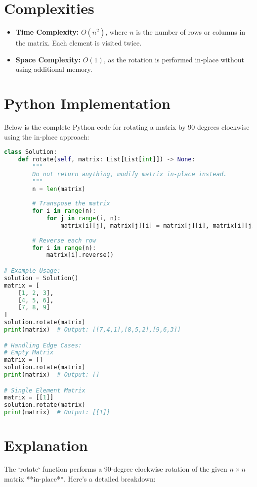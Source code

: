 \section*{Complexities}
\begin{itemize}
    \item \textbf{Time Complexity:} \(O(n^2)\), where \(n\) is the number of rows or columns in the matrix. Each element is visited twice.
    \item \textbf{Space Complexity:} \(O(1)\), as the rotation is performed in-place without using additional memory.
\end{itemize}

\section*{Python Implementation}

Below is the complete Python code for rotating a matrix by 90 degrees clockwise using the in-place approach:

\begin{fullwidth}
\begin{lstlisting}[language=Python]
class Solution:
    def rotate(self, matrix: List[List[int]]) -> None:
        """
        Do not return anything, modify matrix in-place instead.
        """
        n = len(matrix)
        
        # Transpose the matrix
        for i in range(n):
            for j in range(i, n):
                matrix[i][j], matrix[j][i] = matrix[j][i], matrix[i][j]
        
        # Reverse each row
        for i in range(n):
            matrix[i].reverse()

# Example Usage:
solution = Solution()
matrix = [
    [1, 2, 3],
    [4, 5, 6],
    [7, 8, 9]
]
solution.rotate(matrix)
print(matrix)  # Output: [[7,4,1],[8,5,2],[9,6,3]]

# Handling Edge Cases:
# Empty Matrix
matrix = []
solution.rotate(matrix)
print(matrix)  # Output: []

# Single Element Matrix
matrix = [[1]]
solution.rotate(matrix)
print(matrix)  # Output: [[1]]
\end{lstlisting}
\end{fullwidth}

\section*{Explanation}
The `rotate` function performs a 90-degree clockwise rotation of the given \( n \times n \) matrix **in-place**. Here's a detailed breakdown:

